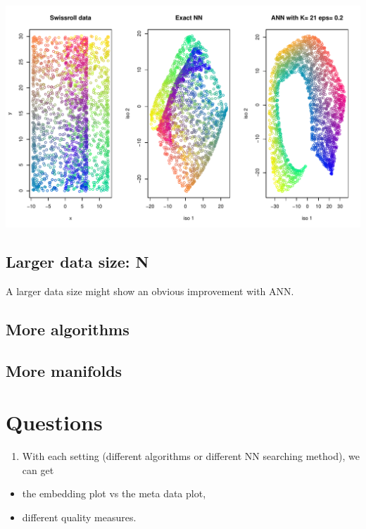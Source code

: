 \documentclass[11pt,a4paper,]{article}
\providecommand{\tightlist}{%
  \setlength{\itemsep}{0pt}\setlength{\parskip}{0pt}}
\begin{document}
\includegraphics{Simulation_files/figure-latex/plot_optim-1.pdf}

\hypertarget{larger-data-size-n}{%
\subsection{Larger data size: N}\label{larger-data-size-n}}

A larger data size might show an obvious improvement with ANN.

\hypertarget{more-algorithms}{%
\subsection{More algorithms}\label{more-algorithms}}

\hypertarget{more-manifolds}{%
\subsection{More manifolds}\label{more-manifolds}}

\hypertarget{questions}{%
\section{Questions}\label{questions}}

\begin{enumerate}
\def\labelenumi{\arabic{enumi})}
\tightlist
\item
  With each setting (different algorithms or different NN searching method), we can get
\end{enumerate}

\begin{itemize}
\item
  the embedding plot vs the meta data plot,
\item
  different quality measures.
\end{itemize}
\end{document}
